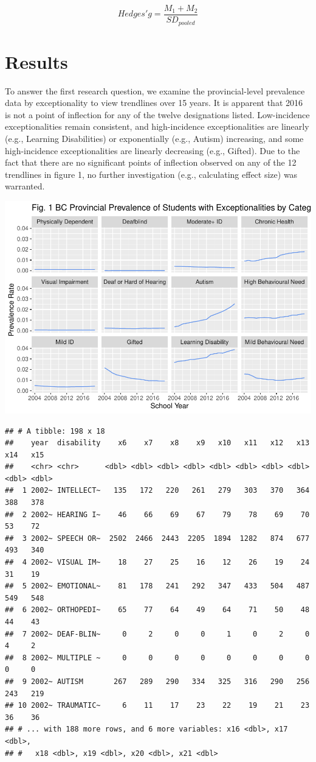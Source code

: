 \documentclass[
  english,
  man,floatsintext]{apa6}
\begin{document}
\[
Hedges' g = \frac{M_1 + M_2}{SD_{pooled}} 
\]

\hypertarget{results}{%
\section{Results}\label{results}}

To answer the first research question, we examine the provincial-level prevalence data by exceptionality to view trendlines over 15 years. It is apparent that 2016 is not a point of inflection for any of the twelve designations listed. Low-incidence exceptionalities remain consistent, and high-incidence exceptionalities are linearly (e.g., Learning Disabilities) or exponentially (e.g., Autism) increasing, and some high-incidence exceptionalities are linearly decreasing (e.g., Gifted). Due to the fact that there are no significant points of inflection observed on any of the 12 trendlines in figure 1, no further investigation (e.g., calculating effect size) was warranted.

\includegraphics{Final_project_files/figure-latex/Provinical_Data_Overview-1.pdf}

\begin{verbatim}
## # A tibble: 198 x 18
##    year  disability    x6    x7    x8    x9   x10   x11   x12   x13   x14   x15
##    <chr> <chr>      <dbl> <dbl> <dbl> <dbl> <dbl> <dbl> <dbl> <dbl> <dbl> <dbl>
##  1 2002~ INTELLECT~   135   172   220   261   279   303   370   364   388   378
##  2 2002~ HEARING I~    46    66    69    67    79    78    69    70    53    72
##  3 2002~ SPEECH OR~  2502  2466  2443  2205  1894  1282   874   677   493   340
##  4 2002~ VISUAL IM~    18    27    25    16    12    26    19    24    31    19
##  5 2002~ EMOTIONAL~    81   178   241   292   347   433   504   487   549   548
##  6 2002~ ORTHOPEDI~    65    77    64    49    64    71    50    48    44    43
##  7 2002~ DEAF-BLIN~     0     2     0     0     1     0     2     0     4     2
##  8 2002~ MULTIPLE ~     0     0     0     0     0     0     0     0     0     0
##  9 2002~ AUTISM       267   289   290   334   325   316   290   256   243   219
## 10 2002~ TRAUMATIC~     6    11    17    23    22    19    21    23    36    36
## # ... with 188 more rows, and 6 more variables: x16 <dbl>, x17 <dbl>,
## #   x18 <dbl>, x19 <dbl>, x20 <dbl>, x21 <dbl>
\end{verbatim}
\end{document}
